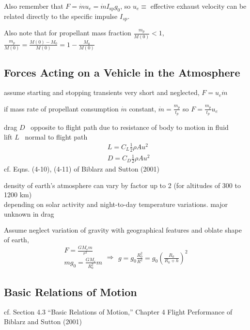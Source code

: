 \documentclass[10pt]{amsart}
\begin{document}
\begin{multicols*}{2}
Also remember that $F = \dot{m}u_e = \dot{m}I_{\text{sp}}g_0$, so $u_e \equiv $ effective exhaust velocity can be related directly to the specific impulse $I_{sp}$.  

Also note that for propellant mass fraction $\frac{m_p}{M(0)} < 1$, $\frac{m_p}{M(0)} = \frac{M(0) - M_0 }{M(0)} = 1 - \frac{M_0}{M(0)}$

\subsection{Forces Acting on a Vehicle in the Atmosphere}

assume starting and stopping transients very short and neglected, $F = u_e \dot{m}$

if mass rate of propellant consumption $\dot{m}$ constant, $\dot{m} = \frac{m_p}{t_p}$ so $F = \frac{m_p}{t_p} u_e$ 

drag $D$ \quad \, opposite to flight path due to resistance of body to motion in fluid \\
lift $L$ \quad \, normal to flight path 
\[
\begin{aligned}
  & L = C_L \frac{1}{2} \rho A u^2 \\ 
  & D = C_D \frac{1}{2} \rho A u^2 
\end{aligned}
\]
cf. Eqns. (4-10), (4-11) of Biblarz and Sutton (2001) \cite{GSuttonOBiblarz2001} 

density of earth's atmosphere can vary by factor up to 2 (for altitudes of 300 to 1200 km) \\
\phantom{\quad \, } depending on solar activity and night-to-day temperature variations. major unknown in drag

Assume neglect variation of gravity with geographical features and oblate shape of earth, 
\[
\begin{gathered}
  F = \frac{GM_e m}{r^2} \\
  mg_0 = \frac{GM_e}{R_0^2} m 
\end{gathered} \Longrightarrow \begin{gathered}
  g = g_0 \frac{R_0^2}{R^2} = g_0 \left( \frac{R_0}{R_0 + h } \right)^2
\end{gathered}
\]

\subsection{Basic Relations of Motion}

cf. Section 4.3 ``Basic Relations of Motion,'' Chapter 4 Flight Performance of Biblarz and Sutton (2001) \cite{GSuttonOBiblarz2001} 


\end{multicols*}
\end{document}
